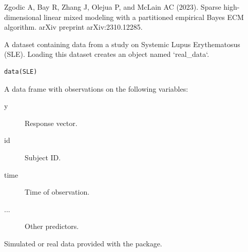 \documentclass[a4paper]{book}
\begin{document}
%
\begin{References}
Zgodic A, Bay R, Zhang J, Olejua P, and McLain AC (2023). Sparse high-dimensional linear mixed modeling with a partitioned empirical Bayes ECM algorithm. arXiv preprint arXiv:2310.12285.
\end{References}
%
\begin{Examples}
\end{Examples}
%
\begin{Description}
A dataset containing data from a study on Systemic Lupus Erythematosus (SLE).
Loading this dataset creates an object named `real\_data`.
\end{Description}
%
\begin{Usage}
\begin{verbatim}
data(SLE)
\end{verbatim}
\end{Usage}
%
\begin{Format}
A data frame with observations on the following variables:
\begin{description}

\item[y] Response vector.
\item[id] Subject ID.
\item[time] Time of observation.
\item[...] Other predictors.

\end{description}

\end{Format}
%
\begin{Source}
Simulated or real data provided with the package.
\end{Source}
\printindex{}
\end{document}
